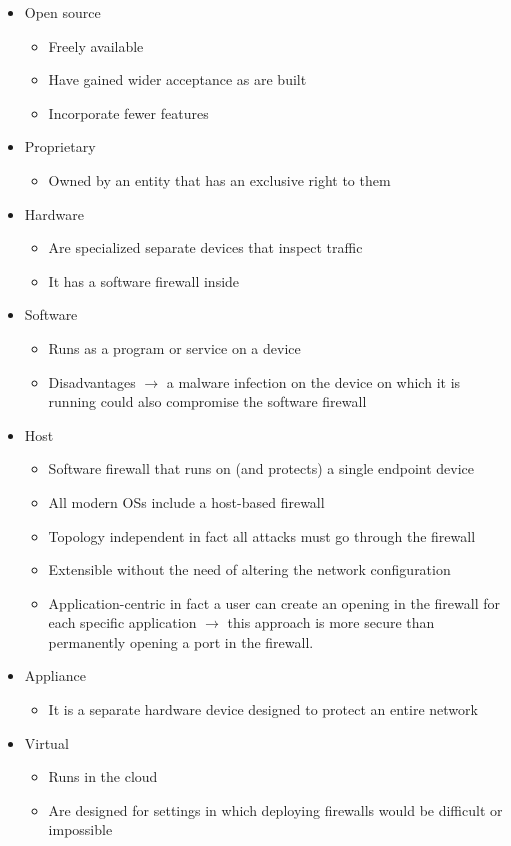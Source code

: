\documentclass{article}
\begin{document}
\begin{itemize}
  \item Open source
    \begin{itemize}
      \item Freely available
      \item Have gained wider acceptance as are built
      \item Incorporate fewer features
    \end{itemize}
  \item Proprietary
    \begin{itemize}
      \item Owned by an entity that has an exclusive right to them
    \end{itemize}
  \item Hardware
    \begin{itemize}
      \item Are specialized separate devices that inspect traffic
      \item It has a software firewall inside
    \end{itemize}
  \item Software
    \begin{itemize}
      \item Runs as a program or service on a device
      \item Disadvantages $\rightarrow$ a malware infection on the device on which it is running could also compromise the software firewall
    \end{itemize}
  \item Host
    \begin{itemize}
      \item Software firewall that runs on (and protects) a single endpoint device
      \item All modern OSs include a host-based firewall
      \item Topology independent in fact all attacks must go through the firewall
      \item Extensible without the need of altering the network configuration
      \item Application-centric in fact a user can create an opening in the firewall for each specific application $\rightarrow$ this approach is more secure than permanently opening a port in the firewall.
    \end{itemize}
  \item Appliance
    \begin{itemize}
      \item It is a separate hardware device designed to protect an entire network
    \end{itemize}
  \item Virtual
    \begin{itemize}
      \item Runs in the cloud
      \item Are designed for settings in which deploying firewalls would be difficult or impossible
    \end{itemize}



\end{itemize}
\end{document}
